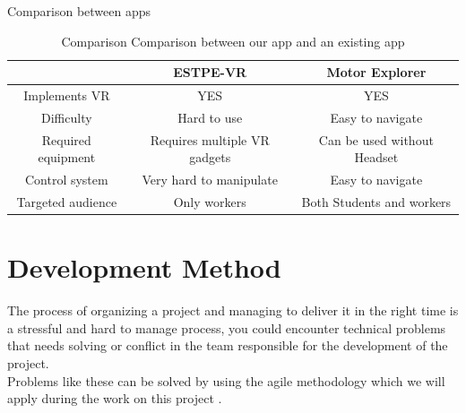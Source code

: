 \documentclass[]{report}
\begin{document}
{\Large{\color[HTML]{6200C9} Comparison between  apps}}
\begin{table}[H]

	\begin{center}
	\begin{tabular}{|c|c|c|}
		\hline
		\rowcolor[HTML]{6600ff}
		{\color[HTML]{ffffff} }                   & {\color[HTML]{ffffff} ESTPE-VR}                     & {\color[HTML]{ffffff} Motor Explorer}              \\ \hline
		{\cellcolor[HTML]{6600ff}\color[HTML]{ffffff} Implements VR}      & {\color[HTML]{009901} YES}                          & {\color[HTML]{009901} YES}                         \\ \hline
		{\cellcolor[HTML]{6600ff}\color[HTML]{ffffff} Difficulty}         & {\color[HTML]{FE0000} Hard to use}                  & {\color[HTML]{009901} Easy to navigate}            \\ \hline
		{\cellcolor[HTML]{6600ff}\color[HTML]{ffffff} Required equipment} & {\color[HTML]{FE0000} Requires multiple VR gadgets} & {\color[HTML]{009901} Can be used without Headset} \\ \hline
		{\cellcolor[HTML]{6600ff}\color[HTML]{ffffff} Control system}     & {\color[HTML]{FE0000} Very hard to manipulate}      & {\color[HTML]{009901} Easy to navigate}            \\ \hline
		{\cellcolor[HTML]{6600ff}\color[HTML]{ffffff} Targeted audience}  & {\color[HTML]{FE0000} Only workers}                 & {\color[HTML]{009901} Both Students and workers}   \\ \hline
	\end{tabular}
\end{center}
	\caption[Comparison between our app and an existing app]{Comparison Comparison between our app and an existing app}
\end{table}

\section{Development Method}
The process of organizing a project and managing to deliver it in the right time
is a stressful and hard to manage process, you could encounter technical
problems that needs solving or conflict in the team responsible for the
development of the project. \\
Problems like these can be solved by using the agile methodology which we
will apply during the work on this project .
\end{document}
